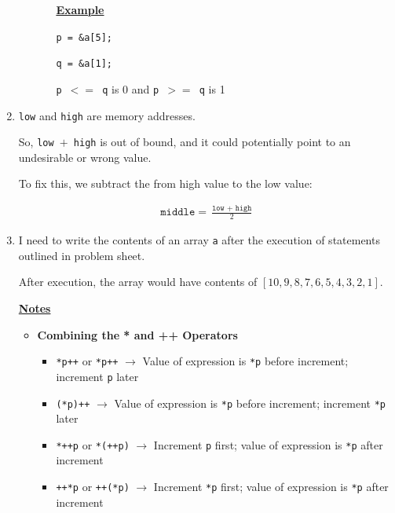 \documentclass[12pt]{article}
\begin{document}
\begin{enumerate}[1.]
\begin{itemize}
\begin{itemize}
            \bigskip

            \underline{\textbf{Example}}

            \bigskip

            \texttt{p = \&a[5];}

            \texttt{q = \&a[1];}

            \bigskip

            \texttt{p $<=$ q} is 0 and \texttt{p $>=$ q} is 1


        \end{itemize}


    \end{itemize}

    \item

    \bigskip

    \texttt{low} and \texttt{high} are memory addresses.

    \bigskip

    So, \texttt{low $+$ high} is out of bound, and it could potentially point to an undesirable or wrong value.

    \bigskip

    To fix this, we subtract the from high value to the low value:

    \bigskip

    \begin{align}
        \texttt{middle} = \frac{\texttt{low $+$ high}}{2}
    \end{align}

    \item

    \bigskip

    I need to write the contents of an array \texttt{a} after the execution of
    statements outlined in problem sheet.

    \bigskip

    After execution, the array would have contents of $[10,9,8,7,6,5,4,3,2,1]$.

    \bigskip

    \underline{\textbf{Notes}}

    \begin{itemize}
        \item \textbf{Combining the * and ++ Operators}

        \begin{itemize}
            \item \texttt{*p++} or \texttt{*{p++}} $\to$ Value of expression is \texttt{*p} before increment; increment \texttt{p} later
            \item \texttt{(*p)++} $\to$ Value of expression is \texttt{*p} before increment; increment \texttt{*p} later
            \item \texttt{*++p} or \texttt{*(++p)} $\to$ Increment \texttt{p} first; value of expression is \texttt{*p} after increment
            \item \texttt{++*p} or \texttt{++(*p)} $\to$ Increment \texttt{*p} first; value of expression is \texttt{*p} after increment
        \end{itemize}


\end{itemize}
\end{enumerate}
\end{document}
